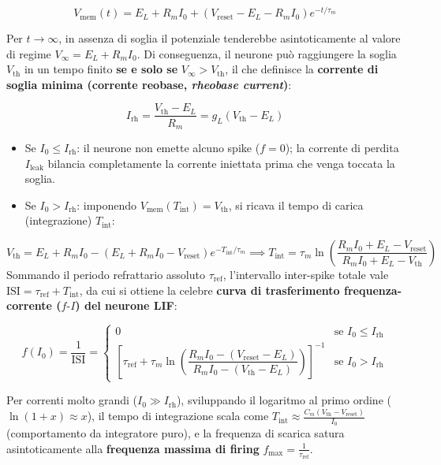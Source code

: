 \documentclass[11pt,a4paper]{article}
\begin{document}
\[
V_{\text{mem}}(t) = E_L + R_m I_0 + \left(V_{\text{reset}} - E_L - R_m I_0\right) e^{-t/\tau_m}
\]

Per $t \to \infty$, in assenza di soglia il potenziale tenderebbe asintoticamente al valore di regime $V_\infty = E_L + R_m I_0$. Di conseguenza, il neurone può raggiungere la soglia $V_{\text{th}}$ in un tempo finito \textbf{se e solo se} $V_\infty > V_{\text{th}}$, il che definisce la \textbf{corrente di soglia minima (corrente reobase, \textit{rheobase current})}:

\[
I_{\text{rh}} = \frac{V_{\text{th}} - E_L}{R_m} = g_L (V_{\text{th}} - E_L)
\]

\begin{itemize}
  \item Se $I_0 \le I_{\text{rh}}$: il neurone non emette alcuno spike ($f = 0$); la corrente di perdita $I_{\text{leak}}$ bilancia completamente la corrente iniettata prima che venga toccata la soglia.
  \item Se $I_0 > I_{\text{rh}}$: imponendo $V_{\text{mem}}(T_{\text{int}}) = V_{\text{th}}$, si ricava il tempo di carica (integrazione) $T_{\text{int}}$:
\end{itemize}
\[
V_{\text{th}} = E_L + R_m I_0 - \left(E_L + R_m I_0 - V_{\text{reset}}\right) e^{-T_{\text{int}}/\tau_m} \implies T_{\text{int}} = \tau_m \ln\left(\frac{R_m I_0 + E_L - V_{\text{reset}}}{R_m I_0 + E_L - V_{\text{th}}}\right)
\]
Sommando il periodo refrattario assoluto $\tau_{\text{ref}}$, l'intervallo inter-spike totale vale $\text{ISI} = \tau_{\text{ref}} + T_{\text{int}}$, da cui si ottiene la celebre \textbf{curva di trasferimento frequenza-corrente ($f\text{-}I$) del neurone LIF}:

\[
f(I_0) = \frac{1}{\text{ISI}} = \begin{cases} 0 & \text{se } I_0 \le I_{\text{rh}} \\ \left[ \tau_{\text{ref}} + \tau_m \ln\left( \dfrac{R_m I_0 - (V_{\text{reset}} - E_L)}{R_m I_0 - (V_{\text{th}} - E_L)} \right) \right]^{-1} & \text{se } I_0 > I_{\text{rh}} \end{cases}
\]

Per correnti molto grandi ($I_0 \gg I_{\text{rh}}$), sviluppando il logaritmo al primo ordine ($\ln(1+x) \approx x$), il tempo di integrazione scala come $T_{\text{int}} \approx \frac{C_m(V_{\text{th}} - V_{\text{reset}})}{I_0}$ (comportamento da integratore puro), e la frequenza di scarica satura asintoticamente alla \textbf{frequenza massima di firing} $f_{\max} = \frac{1}{\tau_{\text{ref}}}$.
\end{document}
